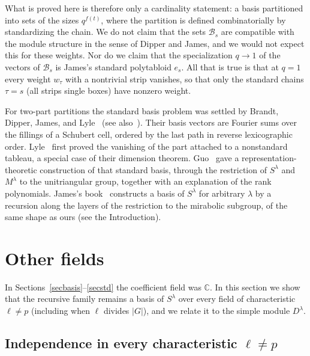 \documentclass[11pt, letterpaper]{amsart}
\theoremstyle{definition}
\theoremstyle{remark}
\newcommand{\CC}{\mathbb{C}}
\begin{document}
What is proved here is therefore only a cardinality statement: a basis partitioned into sets of the sizes $q^{f(t)}$, where the partition is defined combinatorially by standardizing the chain. We do not claim that the sets $\mathcal B_s$ are compatible with the module structure in the sense of Dipper and James, and we would not expect this for these weights. Nor do we claim that the specialization $q\to1$ of the vectors of $\mathcal B_s$ is James's standard polytabloid $e_s$. All that is true is that at $q=1$ every weight $w_\tau$ with a nontrivial strip vanishes, so that only the standard chains $\tau=s$ (all strips single boxes) have nonzero weight.

For two-part partitions the standard basis problem was settled by Brandt, Dipper, James, and Lyle~\cite{BDJL} (see also~\cite{Brandt}). Their basis vectors are Fourier sums over the fillings of a Schubert cell, ordered by the last path in reverse lexicographic order. Lyle~\cite{Lyle} first proved the vanishing of the part attached to a nonstandard tableau, a special case of their dimension theorem. Guo~\cite{Guo,DG} gave a representation-theoretic construction of that standard basis, through the restriction of $S^\lambda$ and $M^\lambda$ to the unitriangular group, together with an explanation of the rank polynomials. James's book~\cite[Ch.~12 (p.~73), Thm.~16.9]{James84} constructs a basis of $S^\lambda$ for arbitrary $\lambda$ by a recursion along the layers of the restriction to the mirabolic subgroup, of the same shape as ours (see the Introduction).

\section{Other fields}\label{secmodular}

In Sections~\ref{secbasis}--\ref{secstd} the coefficient field was $\CC$. In this section we show that the recursive family remains a basis of $S^\lambda$ over every field of characteristic $\ell\neq p$ (including when $\ell$ divides $|G|$), and we relate it to the simple module $D^\lambda$.

\subsection{Independence in every characteristic \texorpdfstring{$\ell\ne p$}{l != p}}\label{subindep}
\end{document}
